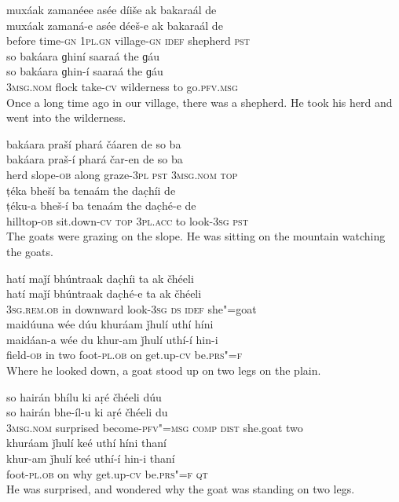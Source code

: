 \begin{exe}
\ex
\label{ex:1}
\glll muxáak	zamanéee	asée	díiše	ak	bakaraál	de \\
muxáak	zamaná-e	asée	déeš-e	ak	bakaraál	de \\
before	time-\textsc{gn} \textsc{1pl.gn}	village-\textsc{gn}	\textsc{idef}	shepherd	\textsc{pst} \\
\glll so	bakáara	ɡhiní	saaraá	the	ɡáu \\
so	bakáara	ɡhin-í	saaraá	the	ɡáu \\
\textsc{3msg.nom}	flock	take-\textsc{cv}	wilderness	to	go.\textsc{pfv.msg} \\
\glt Once a long time ago in our village, there was a shepherd. He took his herd and went into the wilderness.

\ex
\label{ex:2}
\glll bakáara	praší	phará	čáaren	de	so	ba \\
bakáara	praš-í	phará	čar-en	de	so	ba \\
herd	slope-\textsc{ob}	along	graze-\textsc{3pl} \textsc{pst} \textsc{3msg.nom}	\textsc{top} \\
\glll ṭéka	bheší	ba	tenaám	the	dac̣híi	de \\
ṭéku-a	bheš-í	ba	tenaám	the	dac̣hé-e	de \\
hilltop-\textsc{ob}	sit.down-\textsc{cv} \textsc{top}	\textsc{3pl.acc}	to	look-\textsc{3sg} \textsc{pst} \\
\glt The goats were grazing on the slope. He was sitting on the mountain watching the goats.

\ex
\label{ex:3}
\glll hatí	maǰí	bhúntraak	dac̣híi	ta	ak	čhéeli \\
hatí	maǰí	bhúntraak	dac̣hé-e	ta	ak	čhéeli \\
\textsc{3sg.rem.ob}	in	downward	look-\textsc{3sg} \textsc{ds} \textsc{idef}	she"=goat \\
\glll maidúuna	wée	dúu	khuráam	ǰhulí	uthí	híni \\
maidáan-a	wée	du	khur-am	ǰhulí	uthí-í	hin-i \\
field-\textsc{ob}	in	two	foot-\textsc{pl.ob}	on	get.up-\textsc{cv}	be.\textsc{prs"=f} \\
\glt Where he looked down, a goat stood up on two legs on the plain.

\ex
\label{ex:4}
\glll so	hairán	bhílu	ki	aṛé	čhéeli	dúu \\
so	hairán	bhe-íl-u	ki	aṛé	čhéeli	du \\
\textsc{3msg.nom}	surprised	become-\textsc{pfv"=msg}  \textsc{comp}	\textsc{dist}	she.goat	two \\
\glll khuráam	ǰhulí	keé	uthí	híni	thaní \\
khur-am	ǰhulí	keé	uthí-í	hin-i	thaní \\
foot-\textsc{pl.ob}	on	why	get.up-\textsc{cv}	be.\textsc{prs"=f} \textsc{qt} \\
\glt He was surprised, and wondered why the goat was standing on two legs.


\end{exe}
